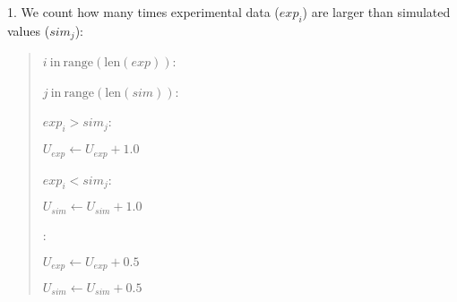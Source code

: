 \documentclass[letterpaper,10pt,english]{sphinxmanual}
\begin{document}
1. We count how many times experimental data (\(exp_i\)) are larger than
simulated values (\(sim_j\)):
\begin{quote}

\begin{DUlineblock}{0em}
\item[]  \(i \mathrm{\ in\ } \mathrm{range} ( \mathrm{len}(exp) )\):
\item[]
\begin{DUlineblock}{\DUlineblockindent}
\item[]  \(j \mathrm{\ in\ } \mathrm{range} ( \mathrm{len}(sim) )\):
\item[]
\begin{DUlineblock}{\DUlineblockindent}
\item[]  \(exp_{i} > sim_{j}\):
\item[]
\begin{DUlineblock}{\DUlineblockindent}
\item[] \(U_{exp} \gets U_{exp} + 1.0\)
\end{DUlineblock}
\item[]  \(exp_{i} < sim_{j}\):
\item[]
\begin{DUlineblock}{\DUlineblockindent}
\item[] \(U_{sim} \gets U_{sim} + 1.0\)
\end{DUlineblock}
\item[] :
\item[]
\begin{DUlineblock}{\DUlineblockindent}
\item[] \(U_{exp} \gets U_{exp} + 0.5\)
\item[] \(U_{sim} \gets U_{sim} + 0.5\)
\end{DUlineblock}
\end{DUlineblock}
\end{DUlineblock}
\end{DUlineblock}
\end{quote}
\end{document}
